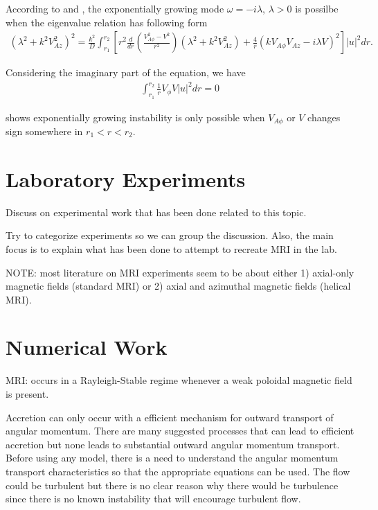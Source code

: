 \documentclass{jfm}
\begin{document}
According to \cite{Knobloch1992} and \cite{Julien2010}, the exponentially growing mode $\omega =-i\lambda$, $\lambda>0$ is possilbe when the eigenvalue relation has following form
\begin{align}
    (\lambda^2 +k^2 V_{Az}^2)^2 = \frac{k^2}{D}\int_{r_1}^{r_2} \left[ r^2 \frac{d}{dr}\left( \frac{V_{A\phi}^2-V^2}{r^2}\right)(\lambda^2+k^2 V_{Az}^2) + \frac{4}{r}(k V_{A\phi} V_{Az}-i\lambda V)^2 \right]|u|^2 dr.
\end{align}

Considering the imaginary part of the equation, we have 
\begin{align}
    \int_{r_1}^{r_2} \frac{1}{r}V_\phi V |u|^2 dr =0
\end{align}

\cite{Knobloch1992} shows exponentially growing instability is only possible when $V_{A\phi}$ or $V$ changes sign somewhere in $r_1< r < r_2$.



\section{Laboratory Experiments}
Discuss on experimental work that has been done related to this topic.

Try to categorize experiments so we can group the discussion. Also, the main
focus is to explain what has been done to attempt to recreate MRI in the lab.

NOTE: most literature on MRI experiments seem to be about either 1) axial-only
magnetic fields (standard MRI) or 2) axial and azimuthal magnetic fields
(helical MRI).



\section{Numerical Work}

MRI: occurs in a Rayleigh-Stable regime whenever a weak poloidal magnetic field is present.

Accretion can only occur with a efficient mechanism for outward transport of angular momentum. There are many suggested processes that can lead to efficient accretion but none leads to substantial outward angular momentum transport. Before using any model, there is a need to understand the angular momentum transport characteristics so that the appropriate equations can be used. The flow could be turbulent but there is no clear reason why there would be turbulence since there is no known instability that will encourage turbulent flow.
\end{document}
